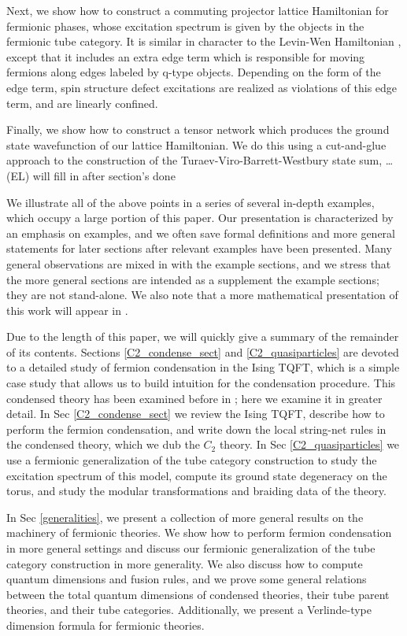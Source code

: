 \documentclass[12pt,a4paper]{article}
\newcommand{\ethan}[1]{{\color{amethyst}\footnotesize{(EL) #1}}}
\begin{document}
Next, we show how to construct a commuting projector lattice Hamiltonian 
for fermionic phases, whose excitation spectrum is given by the objects in the fermionic tube category.  
It is similar in character to the Levin-Wen Hamiltonian \cite{levin2005}, 
except that it includes an extra edge term which is responsible for moving fermions along
edges labeled by q-type objects. 
Depending on the form of the edge term, spin structure defect excitations 
are realized as violations of this edge term, and are linearly confined. 

Finally, we show how to construct a tensor network which produces the ground state 
wavefunction of our lattice Hamiltonian. We do this using a cut-and-glue approach to 
the construction of the Turaev-Viro-Barrett-Westbury state sum, \dots \ethan{will fill in after section's done}

We illustrate all of the above points in a series of several in-depth examples, which occupy a large portion 
of this paper.
Our presentation is characterized by an emphasis on examples, 
and we often save formal definitions and more general statements 
for later sections after relevant examples have been presented.  
Many general observations are mixed in with the example sections,
and we stress that the more general sections are intended as a supplement
the example sections; they are not stand-alone.
We also note that a more mathematical presentation of this work will appear in \cite{Kevin and scott's paper?}. 


Due to the length of this paper, we will quickly give a summary of the remainder of its contents.
Sections \ref{C2_condense_sect} and \ref{C2_quasiparticles} are devoted to a detailed study of 
fermion condensation in the Ising TQFT, which is a simple case study that allows us to build intuition for the condensation procedure.
This condensed theory has been examined before in \cite{bhardwaj2016, kapustin2017}; 
here we examine it in greater detail. 
In Sec \ref{C2_condense_sect} we review the Ising TQFT, describe how to perform the 
fermion condensation, and write down the local string-net rules in the condensed theory, 
which we dub the $C_2$ theory. 
In Sec \ref{C2_quasiparticles} we use a fermionic generalization of the tube category 
construction to study the excitation spectrum of this model, compute its ground state 
degeneracy on the torus, and study the modular transformations and braiding data of 
the theory. 

In Sec \ref{generalities}, we present a collection of more general results
on the machinery of fermionic theories. 
We show how to perform fermion condensation in more general settings
and discuss our fermionic generalization 
of the tube category construction in more generality.
We also discuss how to compute quantum dimensions and fusion rules,
and we prove some general
relations between the total quantum dimensions of condensed theories, their 
tube parent theories, and their tube categories.
Additionally, we present a Verlinde-type
dimension formula for fermionic theories.
\end{document}
